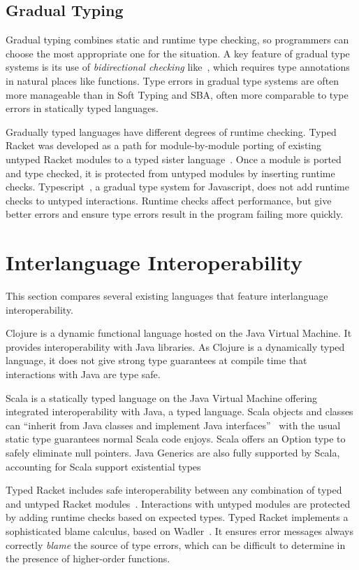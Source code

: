 \subsection{Gradual Typing}

Gradual typing combines static and runtime type checking, so programmers
can choose the most appropriate one for the situation.
A key feature of gradual type systems is its use of \emph{bidirectional checking}
like~\cite{PT00}, which requires type annotations in natural places like functions.
Type errors in gradual type systems are often more manageable than in Soft Typing and SBA,
often more comparable to type errors in statically typed languages.

Gradually typed languages have different degrees of runtime checking.
Typed Racket was developed as a path for module-by-module
porting of existing untyped Racket modules to a typed sister language~\cite{Tob10}.
Once a module is ported and type checked, it is protected from untyped modules
by inserting runtime checks.
Typescript~\cite{TypeS2012}, a gradual type system for Javascript, 
does not add runtime checks to untyped interactions.
Runtime checks affect performance, but give better errors and ensure
type errors result in the program failing more quickly.

\section{Interlanguage Interoperability}

This section compares several existing languages that feature interlanguage interoperability.

Clojure is a dynamic functional language hosted on the Java Virtual Machine. It provides 
interoperability with Java libraries. As Clojure is a dynamically typed language, it does
not give strong type guarantees at compile time that interactions with Java
are type safe.

Scala is a statically typed language on the Java Virtual Machine offering integrated interoperability with Java, a typed language.
Scala objects and classes can ``inherit from Java classes and implement Java interfaces''~\cite{OCD+}
with the usual static type guarantees normal Scala code enjoys.
Scala offers an Option type to safely eliminate null pointers.
Java Generics are also fully supported by Scala, accounting for Scala support existential types

Typed Racket includes safe interoperability between any combination of typed and untyped 
Racket modules~\cite{Tob10,TF08}. 
Interactions with untyped modules are protected by adding runtime checks based on expected types.
Typed Racket implements a sophisticated blame calculus, based on Wadler~\cite{WF09}. It ensures 
error messages always correctly \emph{blame} the source of type errors,
which can be difficult to determine in the presence of higher-order functions. 

